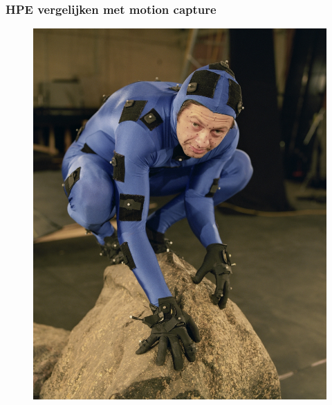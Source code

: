 \documentclass
   [kulak] %
   {kulakbeamer}
\begin{document}
\begin{frame}
	\frametitle{HPE vergelijken met motion capture}
	\begin{figure}
		\begin{minipage}[b]{.4\linewidth}
			\centering\includegraphics[width= \textwidth]{3D_motion_capture}
			\label{fig:1a}
		\end{minipage}%
		\begin{minipage}[b]{.4\linewidth}

\end{minipage}
\end{figure}
\end{frame}
\end{document}

